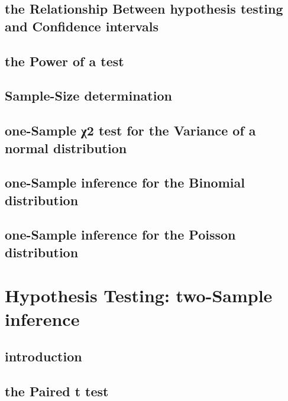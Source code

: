 \documentclass[12pt,]{article}
\theoremstyle{definition}
\theoremstyle{definition}
\theoremstyle{definition}
\theoremstyle{remark}
\begin{document}
\subsection{the Relationship Between hypothesis testing and Confidence
intervals}\label{the-relationship-between-hypothesis-testing-and-confidence-intervals}

\subsection{the Power of a test}\label{the-power-of-a-test}

\subsection{Sample-Size determination}\label{sample-size-determination}

\subsection{one-Sample χ2 test for the Variance of a normal
distribution}\label{one-sample-2-test-for-the-variance-of-a-normal-distribution}

\subsection{one-Sample inference for the Binomial
distribution}\label{one-sample-inference-for-the-binomial-distribution}

\subsection{one-Sample inference for the Poisson
distribution}\label{one-sample-inference-for-the-poisson-distribution}

\section{Hypothesis Testing: two-Sample
inference}\label{hypothesis-testing-two-sample-inference}

\subsection{introduction}\label{introduction-5}

\subsection{the Paired t test}\label{the-paired-t-test}
\end{document}
